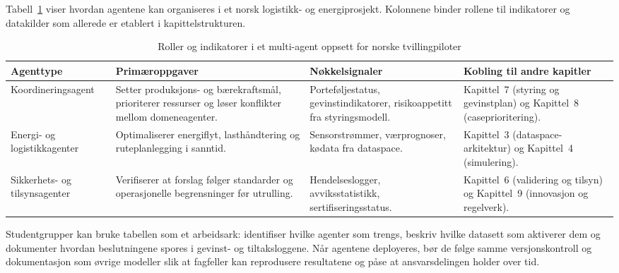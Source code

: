 Tabell~\ref{tab:multiagent-roller} viser hvordan agentene kan organiseres i et norsk logistikk- og energiprosjekt. Kolonnene binder rollene til indikatorer og datakilder som allerede er etablert i kapittelstrukturen.

\begin{table}[htbp]
    \centering
    \caption{Roller og indikatorer i et multi-agent oppsett for norske tvillingpiloter}
    \label{tab:multiagent-roller}
    \begin{tabular}{p{3.4cm}p{4.2cm}p{3.6cm}p{3.8cm}}
        \toprule
        \textbf{Agenttype} & \textbf{Primæroppgaver} & \textbf{Nøkkelsignaler} & \textbf{Kobling til andre kapitler} \\
        \midrule
        Koordineringsagent & Setter produksjons- og bærekraftsmål, prioriterer ressurser og løser konflikter mellom domeneagenter. & Porteføljestatus, gevinstindikatorer, risikoappetitt fra styringsmodell. & Kapittel~7 (styring og gevinstplan) og Kapittel~8 (caseprioritering). \\
        \addlinespace
        Energi- og logistikkagenter & Optimaliserer energiflyt, lasthåndtering og ruteplanlegging i sanntid. & Sensorstrømmer, værprognoser, kødata fra dataspace. & Kapittel~3 (dataspace-arkitektur) og Kapittel~4 (simulering). \\
        \addlinespace
        Sikkerhets- og tilsynsagenter & Verifiserer at forslag følger standarder og operasjonelle begrensninger før utrulling. & Hendelseslogger, avviksstatistikk, sertifiseringsstatus. & Kapittel~6 (validering og tilsyn) og Kapittel~9 (innovasjon og regelverk). \\
        \bottomrule
    \end{tabular}
\end{table}

Studentgrupper kan bruke tabellen som et arbeidsark: identifiser hvilke agenter som trengs, beskriv hvilke datasett som aktiverer dem og dokumenter hvordan beslutningene spores i gevinst- og tiltaksloggene. Når agentene deployeres, bør de følge samme versjonskontroll og dokumentasjon som øvrige modeller slik at fagfeller kan reprodusere resultatene og påse at ansvarsdelingen holder over tid.

